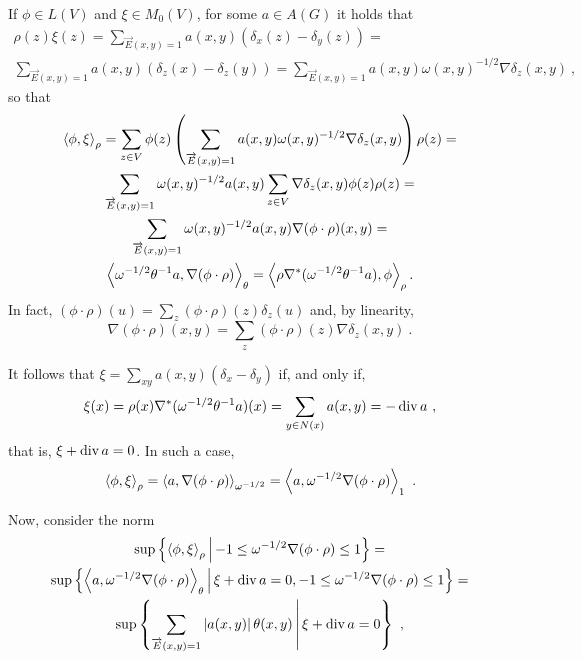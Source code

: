 \documentclass[12pt,a4paper]{amsart}
\theoremstyle{definition}
\begin{document}
If $\phi \in L(V)$ and $\xi \in M_0(V)$, for some $a \in A(G)$ it
holds that
\begin{multline*}
  \rho(z)\xi(z) =
  \sum_{\overrightarrow E(x,y)=1} a(x,y) (\delta_x(z) - \delta_y(z)) = \\
  \sum_{\overrightarrow E(x,y)=1} a(x,y) (\delta_z(x) - \delta_z(y)) =
  \sum_{\overrightarrow E(x,y)=1} a(x,y) \omega(x,y)^{-1/2} \nabla
  \delta_z (x,y) \ ,
\end{multline*}
so that
\begin{multline*}
  \scalarat \rho \phi \xi = \sum_{z \in V} \phi(z)
  \left(\sum_{\overrightarrow E(x,y)=1}
    a(x,y) \omega(x,y)^{-1/2} \nabla \delta_z (x,y)\right) \rho(z) = \\
  \sum_{\overrightarrow E(x,y)=1} \omega(x,y) ^{-1/2} a(x,y) \sum_{z
    \in V} \nabla \delta_z (x,y) \phi(z) \rho(z) = \\
  \sum_{\overrightarrow E(x,y)=1} \omega(x,y) ^{-1/2} a(x,y) \nabla
  (\phi \cdot \rho) (x,y) = \\ \scalarat \theta
  {\omega^{-1/2}\theta^{-1} a} {\nabla (\phi\cdot\rho)} = \scalarat
  \rho {\rho \nabla^* (\omega^{-1/2} \theta^{-1} a)} {\phi} .
\end{multline*}
In fact, $(\phi\cdot\rho)(u) = \sum_z (\phi\cdot\rho)(z) \delta_z(u)$ and,
by linearity,
\begin{equation*}
 \nabla (\phi\cdot\rho) (x,y) = \sum_z (\phi\cdot\rho)(z)
\nabla \delta_z(x,y) \ .
\end{equation*}


It follows that $\xi = \sum_{xy} a(x,y) (\delta_x-\delta_y)$ if, and
only if,
\begin{equation*}
  \xi(x) = \rho(x) \nabla^* (\omega^{-1/2} \theta^{-1} a) (x) = \sum_{y
    \in N(x)}  a(x,y) = - \Div a \ , 
\end{equation*}
that is, $\xi + \Div a = 0$. In such a case,
\begin{equation*}
  \scalarat \rho \phi \xi = \scalarat {\omega^{-1/2}} {a} {\nabla
    (\phi\cdot\rho)} = \scalarat 1 {a} {\omega^{-1/2} \nabla
    (\phi\cdot\rho)} \ .
\end{equation*}

Now, consider the norm
\begin{multline*}
  \sup\setof{\scalarat \rho \phi \xi}{-1 \leq \omega^{-1/2}
    \nabla(\phi\cdot\rho) \leq 1} = \\ \sup\setof{\scalarat \theta a
    {\omega^{-1/2} \nabla(\phi\cdot\rho)} }{\xi + \Div a = 0,
    -1 \leq \omega^{-1/2} \nabla(\phi\cdot\rho) \leq 1} = \\
  \sup\setof{\sum_{\overrightarrow E(x,y) = 1} \avalof{a(x,y)} \theta(x,y)}{\xi + \Div a = 0} \ ,
\end{multline*}
\end{document}
